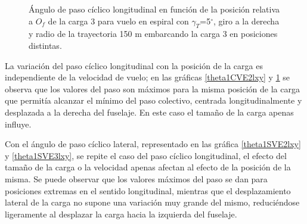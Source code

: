 \begin{figure}
	\centering
	\caption{Ángulo de paso cíclico longitudinal en función de la posición relativa a $O_f$ de la carga 3 para vuelo en espiral con $\gamma_T$=5$^\circ$, giro a la derecha y radio de la trayectoria 150 m embarcando la carga 3 en posiciones distintas.}
	\label{theta1CVE3lxy}
\end{figure}

La variación del paso cíclico longitudinal con la posición de la carga es independiente de la velocidad de vuelo; en las gráficas \ref{theta1CVE2lxy} y \ref{theta1CVE3lxy} se observa que los valores del paso son máximos para la misma posición de la carga que permitía alcanzar el mínimo del paso colectivo, centrada longitudinalmente y desplazada a la derecha del fuselaje. En este caso el tamaño de la carga apenas influye.

Con el ángulo de paso cíclico lateral, representado en las gráfica \ref{theta1SVE2lxy} y \ref{theta1SVE3lxy}, se repite el caso del paso cíclico longitudinal, el efecto del tamaño de la carga o la velocidad apenas afectan al efecto de la posición de la misma.
Se puede observar que los valores máximos del paso se dan para posiciones extremas en el sentido longitudinal, mientras que el desplazamiento lateral de la carga no supone una variación muy grande del mismo, reduciéndose ligeramente al desplazar la carga hacia la izquierda del fuselaje.

